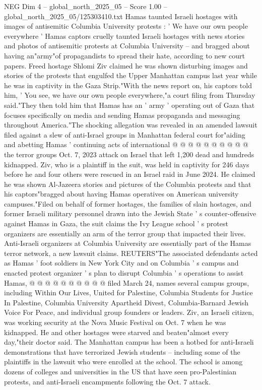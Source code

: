 \begin{textsample}{NEG Dim 4 – global\_north\_2025\_05 – Score 1.00 – global\_north\_2025\_05/125303410.txt}  \label{ex:f4_neg_246}
Hamas taunted Israeli hostages with images of antisemitic Columbia University protests : ' We have our own people everywhere ' Hamas captors cruelly taunted Israeli hostages with news stories and photos of antisemitic protests at Columbia University -- and bragged about having an"army"of propagandists to spread their hate, according to new court papers.
Freed hostage Shlomi Ziv claimed he was shown disturbing images and stories of the protests that engulfed the Upper Manhattan campus last year while he was in captivity in the Gaza Strip."With the news report on, his captors told him, ' You see, we have our own people everywhere,"a court filing from Thursday said."They then told him that Hamas has an ' army ' operating out of Gaza that focuses specifically on media and sending Hamas propaganda and messaging throughout America."The shocking allegation was revealed in an amended lawsuit filed against a slew of anti-Israel groups in Manhattan federal court for"aiding and abetting Hamas ' continuing acts of international @ @ @ @ @ @ @ @ @ @ the terror groups Oct. 7, 2023 attack on Israel that left 1,200 dead and hundreds kidnapped.
Ziv, who is a plaintiff in the suit, was held in captivity for 246 days before he and four others were rescued in an Israel raid in June 2024.
He claimed he was shown Al-Jazeera stories and pictures of the Columbia protests and that his captors"bragged about having Hamas operatives on American university campuses."Filed on behalf of former hostages, the families of slain hostages, and former Israeli military personnel drawn into the Jewish State ' s counter-offensive against Hamas in Gaza, the suit claims the Ivy League school ' s protest organizers are essentially an arm of the terror group that impacted their lives.
Anti-Israeli organizers at Columbia University are essentially part of the Hamas terror network, a new lawsuit claims.
REUTERS"The associated defendants acted as Hamas ' foot soldiers in New York City and on Columbia ' s campus and enacted protest organizer ' s plan to disrupt Columbia ' s operations to assist Hamas, @ @ @ @ @ @ @ @ @ @ filed March 24, names several campus groups, including Within Our Lives, United for Palestine, Columbia Students for Justice In Palestine, Columbia University Apartheid Divest, Columbia-Barnard Jewish Voice For Peace, and individual group founders or leaders.
Ziv, an Israeli citizen, was working security at the Nova Music Festival on Oct. 7 when he was kidnapped.
He and other hostages were starved and beaten"almost every day,"their doctor said.
The Manhattan campus has been a hotbed for anti-Israeli demonstrations that have terrorized Jewish students -- including some of the plaintiffs in the lawsuit who were enrolled at the school.
The school is among dozens of colleges and universities in the US that have seen pro-Palestinian protests, and anti-Israeli encampments following the Oct. 7 attack.

\end{textsample}
